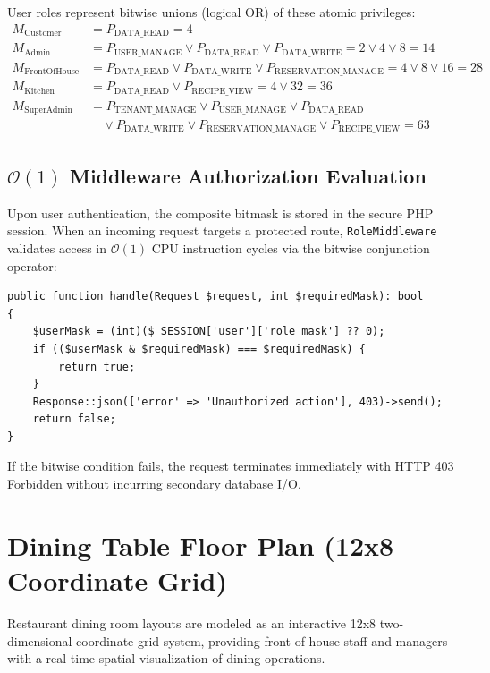 User roles represent bitwise unions (logical OR) of these atomic privileges:
\begin{align}
    M_{\text{Customer}}     &= P_{\text{DATA\_READ}} = 4 \\
    M_{\text{Admin}}        &= P_{\text{USER\_MANAGE}} \lor P_{\text{DATA\_READ}} \lor P_{\text{DATA\_WRITE}} = 2 \lor 4 \lor 8 = 14 \\
    M_{\text{FrontOfHouse}} &= P_{\text{DATA\_READ}} \lor P_{\text{DATA\_WRITE}} \lor P_{\text{RESERVATION\_MANAGE}} = 4 \lor 8 \lor 16 = 28 \\
    M_{\text{Kitchen}}      &= P_{\text{DATA\_READ}} \lor P_{\text{RECIPE\_VIEW}} = 4 \lor 32 = 36 \\
    M_{\text{SuperAdmin}}   &= P_{\text{TENANT\_MANAGE}} \lor P_{\text{USER\_MANAGE}} \lor P_{\text{DATA\_READ}} \\
                            &\quad \lor P_{\text{DATA\_WRITE}} \lor P_{\text{RESERVATION\_MANAGE}} \lor P_{\text{RECIPE\_VIEW}} = 63
\end{align}

\subsection{\texorpdfstring{$\mathcal{O}(1)$}{O(1)} Middleware Authorization Evaluation}
Upon user authentication, the composite bitmask is stored in the secure PHP session. When an incoming request targets a protected route, \texttt{RoleMiddleware} validates access in $\mathcal{O}(1)$ CPU instruction cycles via the bitwise conjunction operator:
\begin{lstlisting}[language=PHPStrict, caption={Bitwise access evaluation in \texttt{src/app/Middleware/RoleMiddleware.php}}, label={lst:rbac_eval}]
public function handle(Request $request, int $requiredMask): bool
{
    $userMask = (int)($_SESSION['user']['role_mask'] ?? 0);
    if (($userMask & $requiredMask) === $requiredMask) {
        return true;
    }
    Response::json(['error' => 'Unauthorized action'], 403)->send();
    return false;
}
\end{lstlisting}
If the bitwise condition fails, the request terminates immediately with HTTP 403 Forbidden without incurring secondary database I/O.

\section{Dining Table Floor Plan (12x8 Coordinate Grid)}
\label{sec:feat_floorplan}
Restaurant dining room layouts are modeled as an interactive 12x8 two-dimensional coordinate grid system, providing front-of-house staff and managers with a real-time spatial visualization of dining operations.

